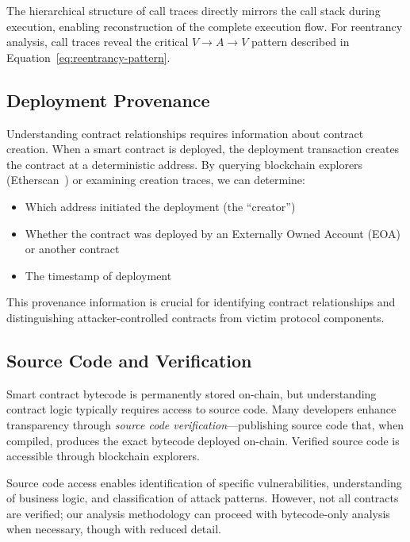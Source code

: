 The hierarchical structure of call traces directly mirrors the call stack during execution, enabling reconstruction of the complete execution flow. For reentrancy analysis, call traces reveal the critical $V \rightarrow A \rightarrow V$ pattern described in Equation~\ref{eq:reentrancy-pattern}.

\subsection{Deployment Provenance}

Understanding contract relationships requires information about contract creation. When a smart contract is deployed, the deployment transaction creates the contract at a deterministic address. By querying blockchain explorers (\eg Etherscan~\cite{etherscan}) or examining creation traces, we can determine:
\begin{itemize}
    \item Which address initiated the deployment (the ``creator'')
    \item Whether the contract was deployed by an Externally Owned Account (EOA) or another contract
    \item The timestamp of deployment
\end{itemize}

This provenance information is crucial for identifying contract relationships and distinguishing attacker-controlled contracts from victim protocol components.

\subsection{Source Code and Verification}

Smart contract bytecode is permanently stored on-chain, but understanding contract logic typically requires access to source code. Many developers enhance transparency through \textit{source code verification}---publishing source code that, when compiled, produces the exact bytecode deployed on-chain. Verified source code is accessible through blockchain explorers.

Source code access enables identification of specific vulnerabilities, understanding of business logic, and classification of attack patterns. However, not all contracts are verified; our analysis methodology can proceed with bytecode-only analysis when necessary, though with reduced detail.

